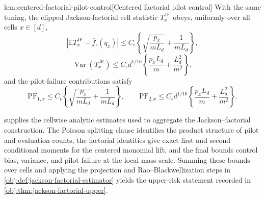\begin{lemmav}{lem:centered-factorial-pilot-control}[Centered factorial pilot control]
With the same tuning, the clipped Jackson-factorial cell statistic \(T_x^{\mathrm{JF}}\) obeys, uniformly over all cells \(x\in[d]\),
\[
\left|
\mathbb E T_x^{\mathrm{JF}}-\bar f_\epsilon(q_x)
\right|
\le
C_\epsilon
\left\{
\sqrt{\frac{p_x}{mL_d}}+\frac{1}{mL_d}
\right\},
\]
\[
\operatorname{Var}(T_x^{\mathrm{JF}})
\le
C_\epsilon d^{1/16}
\left\{
\frac{p_x L_d}{m}+\frac{L_d^2}{m^2}
\right\},
\]
and the pilot-failure contributions satisfy
\[
\mathrm{PF}_{1,x}
\le
C_\epsilon
\left\{
\sqrt{\frac{p_x}{mL_d}}+\frac{1}{mL_d}
\right\},
\qquad
\mathrm{PF}_{2,x}
\le
C_\epsilon d^{1/16}
\left\{
\frac{p_x L_d}{m}+\frac{L_d^2}{m^2}
\right\}.
\]
\end{lemmav}

 supplies the cellwise analytic estimates used to aggregate the Jackson--factorial construction. The Poisson splitting clause identifies the product structure of pilot and evaluation counts, the factorial identities give exact first and second conditional moments for the centered monomial lift, and the final bounds control bias, variance, and pilot failure at the local mass scale. Summing these bounds over cells and applying the projection and Rao--Blackwellization steps in \cref{obj:def:jackson-factorial-estimator} yields the upper-risk statement recorded in \cref{obj:thm:jackson-factorial-upper}.
